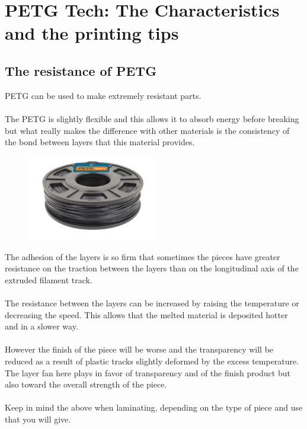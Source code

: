 \documentclass[11pt,a4paper]{article}
\begin{document}
\section{PETG Tech: The Characteristics and the printing tips}
	\subsection{The resistance of PETG}PETG can be used to make extremely resistant parts.
\\\\
The PETG is slightly flexible and this allows it to absorb energy before breaking but what really makes the difference with other materials is the consistency of the bond between layers that this material provides.
\begin{figure}[H]
\centering
\includegraphics[width=0.5\textwidth,cfbox=azul_marcos 1pt 0pt]{FOTOS/PETG250NEGRO}
\end{figure}
The adhesion of the layers is so firm that sometimes the pieces have greater resistance on the traction between the layers than on the longitudinal axis of the extruded filament track.
\\\\
The resistance between the layers can be increased by raising the temperature or decreasing the speed. This allows that the melted material is deposited hotter and in a slower way.
\\\\
However the finish of the piece will be worse and the transparency will be reduced as a result of plastic tracks slightly deformed by the excess temperature. The layer fan here plays in favor of transparency and of the finish product but also toward the overall strength of the piece.
\\\\
Keep in mind the above when laminating, depending on the type of piece and use that you will give.
\end{document}
